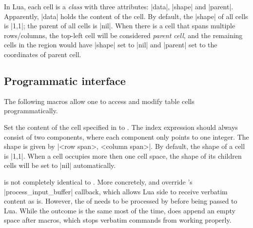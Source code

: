 \documentclass{l3doc}
\begin{document}
\begin{documentation}
In Lua, each cell is a \emph{class} with three attributes: |data|, |shape| and |parent|. Apparently, |data| holds the content of the cell. By default, the |shape| of all cells is |{1,1}|; the parent of all cells is |nil|. When there is a cell that spans multiple rows/columns, the top-left cell will be considered \emph{parent cell}, and the remaining cells in the region would have |shape| set to |nil| and |parent| set to the coordinates of parent cell.

\subsection{Programmatic interface}

The following macros allow one to access and modify table cells programmatically.

\begin{function}{\LPTSetCell}

\begin{syntax}
   
\end{syntax}

Set the content of the cell specified in  to . The index expression should always consist of two components, where each component only points to one integer. The shape is given by |<row span>, <column span>|. By default, the shape of a cell is |1,1|. When a cell occupies more then one cell space, the shape of its children cells will be set to |nil| automatically.

\begin{authornote}
 is not completely identical to . More concretely,  and  override \LuaLaTeX 's |process_input_buffer| callback, which allows Lua side to receive verbatim content as is. However, the  of  needs to be processed by  before being passed to Lua. While the outcome is the same most of the time,  does append an empty space after macros, which stops verbatim commands from working properly.
\end{authornote}

\end{function}

\begin{function}{\LPTFill}
\begin{syntax}
  
\end{syntax}


\end{function}
\end{documentation}
\end{document}
